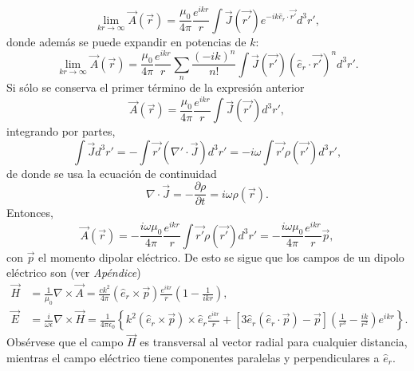 \documentclass[paper=letter, fontsize=12pt,]{article}
\begin{document}
\begin{equation*}
    \lim_{kr\rightarrow\infty}\Vec{A}(\Vec{r})=\frac{\mu_0}{4\pi}\frac{e^{ikr}}{r}\int \Vec{J}(\Vec{r'})e^{-ik\hat{e}_r\cdot\Vec{r'}}d^3r',    
\end{equation*}
donde además se puede expandir en potencias de $k$:
\begin{equation*}
    \lim_{kr\rightarrow\infty}\Vec{A}(\Vec{r})=\frac{\mu_0}{4\pi}\frac{e^{ikr}}{r}\sum_n\frac{(-ik)^n}{n!}\int \Vec{J}(\Vec{r'})(\hat{e}_r\cdot\Vec{r'})^n d^3r'.    
\end{equation*}
Si sólo se conserva el primer término de la expresión anterior
\begin{equation}
    \Vec{A}(\Vec{r})=\frac{\mu_0}{4\pi}\frac{e^{ikr}}{r}\int \Vec{J}(\Vec{r'}) d^3r',    
\end{equation}
integrando por partes,
$$\int\Vec{J}d^3r'=-\int \Vec{r'}(\nabla'\cdot\Vec{J})d^3r'=-i\omega\int \Vec{r'}\rho(\Vec{r'})d^3r',$$
de donde se usa la ecuación de continuidad
\begin{equation}
    \nabla\cdot\Vec{J}=-\frac{\partial\rho}{\partial t}=i\omega\rho(\Vec{r}).    
\end{equation}
Entonces, 
\begin{equation}
    \Vec{A}(\Vec{r})=-\frac{i\omega\mu_0}{4\pi}\frac{e^{ikr}}{r}\int \Vec{r'}\rho(\Vec{r'})d^3r'=-\frac{i\omega\mu_0}{4\pi}\frac{e^{ikr}}{r}\Vec{p} ,   
\end{equation}
con $\Vec{p}$ el momento dipolar eléctrico.
De esto se sigue que los campos de un dipolo eléctrico son (ver \textit{Apéndice})
\begin{align}
    \Vec{H}&=\frac{1}{\mu_0}\nabla\times\Vec{A}=\frac{ck^2}{4\pi}(\hat{e}_r\times\Vec{p})\frac{e^{ikr}}{r}\left(1-\frac{1}{ikr}\right),\\
    \Vec{E}&=\frac{i}{\omega\epsilon}\nabla\times\Vec{H}=\frac{1}{4\pi\epsilon_0}\left\{k^2(\hat{e}_r\times\Vec{p})\times\hat{e}_r\frac{e^{ikr}}{r}+[3\hat{e}_r(\hat{e}_r\cdot\Vec{p})-\Vec{p}]\left(\frac{1}{r^3}-\frac{ik}{r^2}\right)e^{ikr}\right\}.
\end{align}
Obsérvese que el campo $\Vec{H}$ es transversal al vector radial para cualquier distancia, mientras el campo eléctrico tiene componentes paralelas y perpendiculares a $\hat{e}_r$.\\
\end{document}
